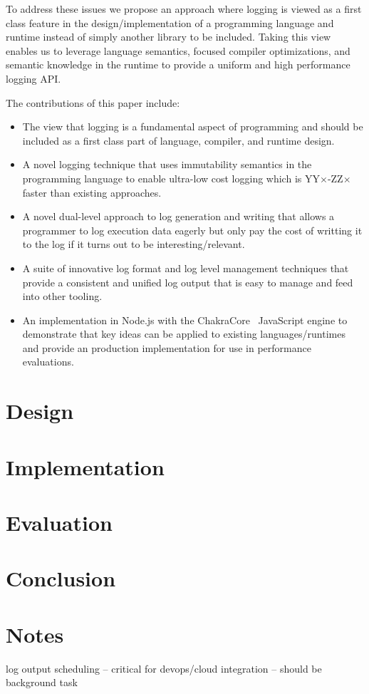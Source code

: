\documentclass[sigplan,10pt,review]{acmart}
\begin{document}
To address these issues we propose an approach where logging is viewed as a first 
class feature in the design/implementation of a programming language and runtime 
instead of simply another library to be included. Taking this view enables us to 
leverage language semantics, focused compiler optimizations, and semantic knowledge 
in the runtime to provide a uniform and high performance logging API.

\noindent
The contributions of this paper include:
\begin{itemize}
\item The view that logging is a fundamental aspect of programming and should be
included as a first class part of language, compiler, and runtime design.

\item A novel logging technique that uses immutability semantics in the
programming language to enable ultra-low cost logging which is
YY$\times$-ZZ$\times$ faster than existing approaches.

\item A novel dual-level approach to log generation and writing that allows a
programmer to log execution data eagerly but only pay the cost of writting it to
the log if it turns out to be interesting/relevant.

\item A suite of innovative log format and log level management techniques that 
provide a consistent and unified log output that is easy to manage and feed into 
other tooling.

\item An implementation in Node.js with the ChakraCore~\cite{NodeChakraCore} 
JavaScript engine to demonstrate that key ideas can be applied to existing
languages/runtimes and provide an production implementation for use in
performance evaluations.
\end{itemize}

\section{Design}
\label{sec:design}


\section{Implementation}
\label{sec:implementation}


\section{Evaluation}
\label{sec:evaluation}


\section{Conclusion}

\section{Notes} log output scheduling -- critical for devops/cloud integration
-- should be background task


\balance

{
\raggedright 

 
}
\end{document}
